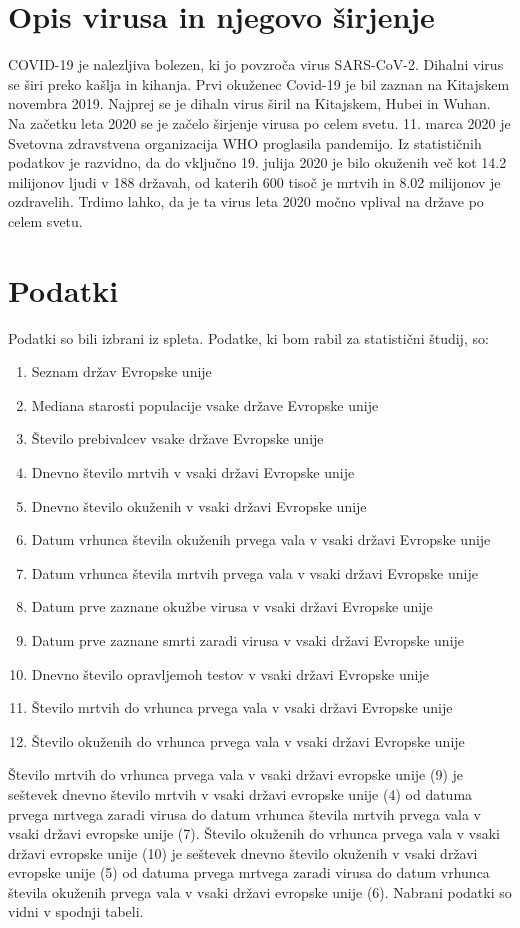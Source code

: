 \documentclass[a4paper,11pt]{article}
\begin{document}
\section{Opis virusa in njegovo širjenje}
COVID-19 je nalezljiva bolezen, ki jo povzroča virus SARS-CoV-2. Dihalni virus se širi preko kašlja in kihanja. Prvi okuženec Covid-19 je bil zaznan na Kitajskem novembra 2019. Najprej se je dihaln virus širil na Kitajskem, Hubei in Wuhan. Na začetku leta 2020 se je začelo širjenje virusa po celem svetu. 11. marca 2020 je Svetovna zdravstvena organizacija WHO proglasila pandemijo. Iz statističnih podatkov je razvidno, da do vključno 19. julija 2020 je bilo okuženih več kot 14.2 milijonov ljudi v 188 državah, od katerih 600 tisoč je mrtvih in 8.02 milijonov je ozdravelih. Trdimo lahko, da je ta virus leta 2020 močno vplival na države po celem svetu.
\section{Podatki}
Podatki so bili izbrani iz spleta. Podatke, ki bom rabil za statistični študij, so:
\begin{enumerate}
\item{Seznam držav Evropske unije}
\item{Mediana starosti populacije vsake države Evropske unije}
\item{Število prebivalcev vsake države Evropske unije}
\item{Dnevno število mrtvih v vsaki državi Evropske unije}
\item{Dnevno število okuženih v vsaki državi Evropske unije}
\item{Datum vrhunca števila okuženih prvega vala v vsaki državi Evropske unije}
\item{Datum vrhunca števila mrtvih prvega vala v vsaki državi Evropske unije}
\item{Datum prve zaznane okužbe virusa v vsaki državi Evropske unije}
\item{Datum prve zaznane smrti zaradi virusa v vsaki državi Evropske unije}
\item{Dnevno število opravljemoh testov v vsaki državi Evropske unije}
\item{Število mrtvih do vrhunca prvega vala v vsaki državi Evropske unije}
\item{Število okuženih do vrhunca prvega vala v vsaki državi Evropske unije}
\end{enumerate}

Število mrtvih do vrhunca prvega vala v vsaki državi evropske unije (9) je seštevek dnevno število mrtvih v vsaki državi evropske unije (4) od datuma prvega mrtvega zaradi virusa do datum vrhunca števila mrtvih prvega vala v vsaki državi evropske unije (7).
Število okuženih do vrhunca prvega vala v vsaki državi evropske unije (10) je seštevek dnevno število okuženih v vsaki državi evropske unije (5) od datuma prvega mrtvega zaradi virusa do datum vrhunca števila okuženih prvega vala v vsaki državi evropske unije (6). Nabrani podatki so vidni v spodnji tabeli.\\
\end{document}
